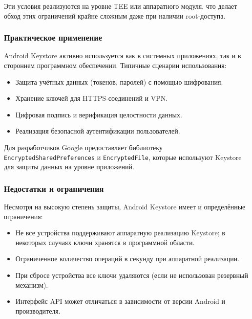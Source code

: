 Эти условия реализуются на уровне TEE или аппаратного модуля, что делает обход этих ограничений крайне сложным даже при наличии root-доступа.

\subsubsection*{Практическое применение}

Android Keystore активно используется как в системных приложениях, так и в
стороннем программном обеспечении. Типичные сценарии использования:

\begin{itemize}
    \item Защита учётных данных (токенов, паролей) с помощью шифрования.
    \item Хранение ключей для HTTPS-соединений и VPN.
    \item Цифровая подпись и верификация целостности данных.
    \item Реализация безопасной аутентификации пользователей.
\end{itemize}

Для разработчиков Google предоставляет библиотеку
\texttt{EncryptedSharedPreferences} и \texttt{EncryptedFile}, которые
используют Keystore для защиты данных на уровне приложений.

\subsubsection*{Недостатки и ограничения}

Несмотря на высокую степень защиты, Android Keystore имеет и определённые ограничения:

\begin{itemize}
    \item Не все устройства поддерживают аппаратную реализацию Keystore; в некоторых случаях ключи хранятся в программной области.
    \item Ограниченное количество операций в секунду при аппаратной реализации.
    \item При сбросе устройства все ключи удаляются (если не использован резервный механизм).
    \item Интерфейс API может отличаться в зависимости от версии Android и производителя.
\end{itemize}

